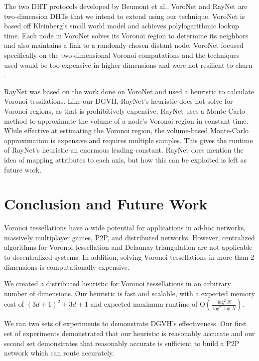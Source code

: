 The two DHT protocols developed by Beumont et al., VoroNet \cite{voronet} and RayNet \cite{raynet} are two-dimension DHTs that we intend to extend using our technique.
VoroNet is based off Kleinberg's small world model \cite{kleinberg2000navigation} and achieves polylogarithmic lookup time.  
Each node in VoroNet solves its Voronoi region to determine its neighbors and also maintains a link to a randomly chosen distant node.
VoroNet focused specifically on the two-dimensional Voronoi computations and the techniques used would be too expensive in higher dimensions and were not resilient to churn  \cite{raynet}.

RayNet \cite{raynet} was based on the work done on VoroNet and used a heuristic to calculate Voronoi tessilations.  
Like our DGVH, RayNet's heuristic does not solve for Voronoi regions, as that is prohibitively expensive.  
RayNet uses a Monte-Carlo method to approximate the volume of a node's Voronoi region in constant time.  
While effective at estimating the Voronoi region,  the volume-based Monte-Carlo approximation is expensive and requires multiple samples. 
This gives the runtime of RayNet's heuristic an enormous leading constant.
RayNet does mention the idea of mapping attributes to each axis, but how this can be exploited is left as future work.







\section{Conclusion and Future Work}
\label{sec:conclusion}


Voronoi tessellations have a wide potential for applications in ad-hoc networks, massively multiplayer games, P2P, and distributed networks. 
However, centralized algorithms for Voronoi tessellation and Delaunay triangulation are not applicable to decentralized systems.
In addition, solving Voronoi tessellations in more than 2 dimensions is computationally expensive.

We created a distributed heuristic for Voronoi tessellations in an arbitrary number of dimensions.
Our heuristic is fast and scalable, with a expected memory cost of $(3d+1)^{2}+3d+1$ and expected maximum runtime of O$(\frac{\log^{2} N}{\log^{2} \log N} )$.

We ran two sets of experiments to demonstrate DGVH's effectiveness.
Our first set of experiments demonstrated that our heuristic is reasonably accurate  and our second set demonstrates that reasonably accurate is sufficient to build a P2P network which can route accurately.


